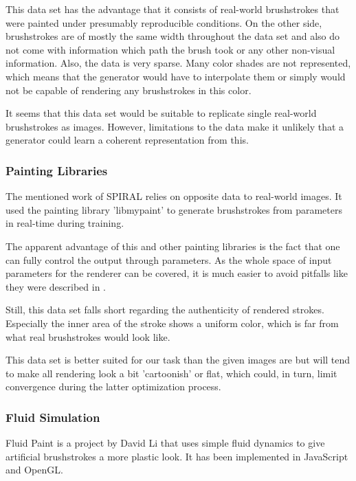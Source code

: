 This data set has the advantage that it consists of real-world brushstrokes that were painted under presumably reproducible conditions.
On the other side, brushstrokes are of mostly the same width throughout the data set and also do not come with information which path the brush took or any other non-visual information.
Also, the data is very sparse.
Many color shades are not represented, which means that the generator would have to interpolate them or simply would not be capable of rendering any brushstrokes in this color.

It seems that this data set would be suitable to replicate single real-world brushstrokes as images.
However, limitations to the data make it unlikely that a generator could learn a coherent representation from this.

\subsubsection{Painting Libraries}

The mentioned work of SPIRAL \cite{SPIRAL} relies on opposite data to real-world images.
It used the painting library 'libmypaint' \cite{libmypaint} to generate brushstrokes from parameters in real-time during training.

The apparent advantage of this and other painting libraries is the fact that one can fully control the output through parameters.
As the whole space of input parameters for the renderer can be covered, it is much easier to avoid pitfalls like they were described in .

Still, this data set falls short regarding the authenticity of rendered strokes.
Especially the inner area of the stroke shows a uniform color, which is far from what real brushstrokes would look like.

This data set is better suited for our task than the given images are but will tend to make all rendering look a bit 'cartoonish' or flat, which could, in turn, limit convergence during the latter optimization process.

\subsubsection{Fluid Simulation}

Fluid Paint is a project by David Li \cite{fluidpaint} that uses simple
fluid dynamics to give artificial brushstrokes a more plastic look.
It has been implemented in JavaScript and OpenGL.

